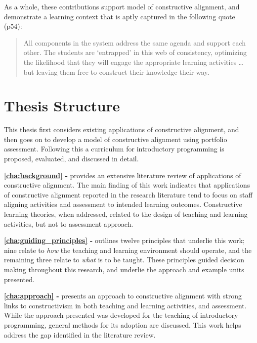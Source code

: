 As a whole, these contributions support \citet{Biggs:1996c} model of constructive alignment, and demonstrate a learning context that is aptly captured in the following quote \citep{Biggs:2007} (p54):
\begin{quote}
	All components in the system address the same agenda and support each other. The students are `entrapped' in this web of consistency, optimizing the likelihood that they will engage the appropriate learning activities \ldots but leaving them free to construct their knowledge their way.
\end{quote}


\clearpage
\section{Thesis Structure} %
\label{sec:thesis_structure}

This thesis first considers existing applications of constructive alignment, and then goes on to develop a model of constructive alignment using portfolio assessment. Following this a curriculum for introductory programming is proposed, evaluated, and discussed in detail. 

\textbf{\cref{cha:background} - } provides an extensive literature review of applications of constructive alignment. The main finding of this work indicates that applications of constructive alignment reported in the research literature tend to focus on staff aligning activities and assessment to intended learning outcomes. Constructive learning theories, when addressed, related to the design of teaching and learning activities, but not to assessment approach.

\textbf{\cref{cha:guiding_principles} - } outlines twelve principles that underlie this work; nine relate to \emph{how} the teaching and learning environment should operate, and the remaining three relate to \emph{what} is to be taught. These principles guided decision making throughout this research, and underlie the approach and example units presented.

\textbf{\cref{cha:approach} - } presents an approach to constructive alignment with strong links to constructivism in both teaching and learning activities, and assessment. While the approach presented was developed for the teaching of introductory programming, general methods for its adoption are discussed. This work helps address the gap identified in the literature review.

